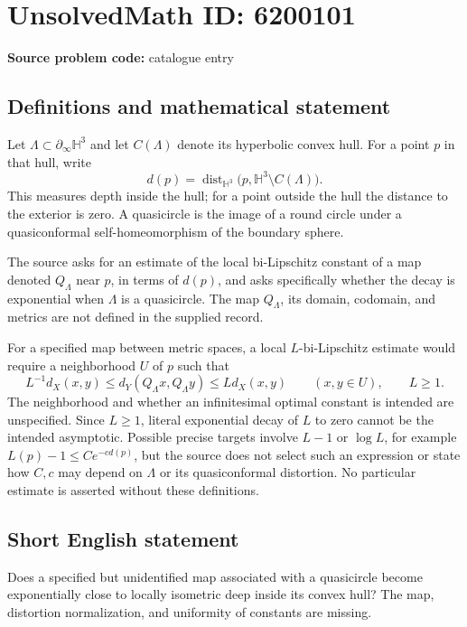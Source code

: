 \documentclass[11pt]{article}
\begin{document}
\section*{UnsolvedMath ID: 6200101}
\textbf{Source problem code:} catalogue entry
\subsection{Definitions and mathematical statement}
Let $\Lambda\subset\partial_\infty\mathbb H^3$ and let $C(\Lambda)$ denote its hyperbolic convex hull. For a point $p$ in that hull, write
\[
d(p)=\operatorname{dist}_{\mathbb H^3}\bigl(p,\mathbb H^3\setminus C(\Lambda)\bigr).
\]
This measures depth inside the hull; for a point outside the hull the distance to the exterior is zero. A quasicircle is the image of a round circle under a quasiconformal self-homeomorphism of the boundary sphere.

The source asks for an estimate of the local bi-Lipschitz constant of a map denoted $Q_\Lambda$ near $p$, in terms of $d(p)$, and asks specifically whether the decay is exponential when $\Lambda$ is a quasicircle. The map $Q_\Lambda$, its domain, codomain, and metrics are not defined in the supplied record.

For a specified map between metric spaces, a local $L$-bi-Lipschitz estimate would require a neighborhood $U$ of $p$ such that
\[
L^{-1}d_X(x,y)\leq d_Y(Q_\Lambda x,Q_\Lambda y)\leq Ld_X(x,y)
\qquad(x,y\in U),\qquad L\geq1.
\]
The neighborhood and whether an infinitesimal optimal constant is intended are unspecified. Since $L\geq1$, literal exponential decay of $L$ to zero cannot be the intended asymptotic. Possible precise targets involve $L-1$ or $\log L$, for example $L(p)-1\leq Ce^{-c d(p)}$, but the source does not select such an expression or state how $C,c$ may depend on $\Lambda$ or its quasiconformal distortion. No particular estimate is asserted without these definitions.
\subsection{Short English statement}
Does a specified but unidentified map associated with a quasicircle become exponentially close to locally isometric deep inside its convex hull? The map, distortion normalization, and uniformity of constants are missing.
\end{document}
